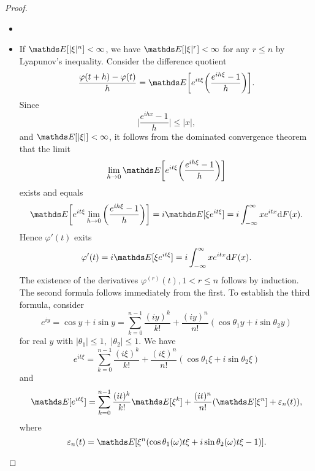 \begin{proof}
\begin{itemize}
    \item []
    \item If $\E[|\xi|^n] < \infty$, we have $\E[|\xi|^r] < \infty$ for any $r \le n$ by Lyapunov's inequality. Consider the difference quotient 
\begin{equation*}
    \frac{\varphi(t + h) - \varphi(t)}{h} = \E\bigg[e^{i t\xi} \bigg(\frac{e^{ih\xi} - 1}{h}\bigg)\bigg].
\end{equation*}
Since 
\begin{equation*}
    \bigg| \frac{e^{ihx}-1}{h} \bigg| \le |x|,
\end{equation*}
and $\E[|\xi|] < \infty$, it follows from the dominated convergence theorem that the limit
\begin{equation*}
    \lim_{h \to 0} \E\bigg[e^{i t\xi} \bigg(\frac{e^{ih\xi} - 1}{h}\bigg)\bigg]
\end{equation*}
exists and equals
\begin{equation*}
    \E\bigg[e^{i t\xi} \lim_{h \to 0}\bigg(\frac{e^{ih\xi} - 1}{h}\bigg)\bigg] = i \E[\xi e^{it\xi}] = i\int_{-\infty}^\infty x e^{itx} \d F(x).
\end{equation*}
Hence $\varphi'(t)$ exits
\begin{equation*}
    \varphi'(t) = i \E[\xi e^{it\xi}] = i\int_{-\infty}^\infty x e^{itx} \d F(x).
\end{equation*}
The existence of the derivatives $\varphi^{(r)}(t), 1 < r \le n$ follows by induction. The second formula follows immediately from the first. To establish the third formula, consider
\begin{equation*}
    e^{iy} = \cos y + i \sin y = \sum_{k=0}^{n-1} \frac{(iy)^k}{k!} + \frac{(iy)^n}{n!}(\cos \theta_1y + i \sin \theta_2 y)
\end{equation*}
for real $y$ with $|\theta_1| \le 1,$ $|\theta_2| \le 1$. We have 
\begin{equation*}
    e^{it\xi} = \sum_{k=0}^{n-1} \frac{(i\xi)^k}{k!} + \frac{(i\xi)^n}{n!}(\cos \theta_1\xi + i \sin \theta_2 \xi)
\end{equation*}
and 
\begin{equation*}
    \E[e^{it\xi}] = \sum_{k=0}^{n-1} \frac{(it)^k}{k!}\E[\xi^k] + \frac{(it)^n}{n!}(\E[\xi^n] + \varepsilon_n(t)),
\end{equation*}
where
\begin{equation*}
    \varepsilon_n(t) = \E[\xi^n (\cos \theta_1(\omega) t \xi + i \sin \theta_2(\omega)t \xi - 1)].

\end{equation*}
\end{itemize}
\end{proof}
